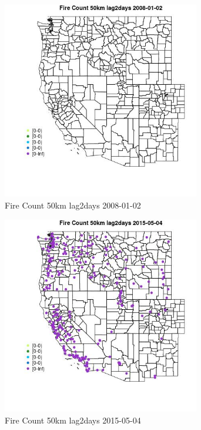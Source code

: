 \begin{figure} 
\centering  
\includegraphics[width=0.77\textwidth]{Code_Outputs/Report_ML_input_PM25_Step4_part_e_de_duplicated_aves_compiled_2019-05-18wNAs_MapObsFire_Count_50km_lag2days2008-01-02.jpg} 
\caption{\label{fig:Report_ML_input_PM25_Step4_part_e_de_duplicated_aves_compiled_2019-05-18wNAsMapObsFire_Count_50km_lag2days2008-01-02}Fire Count 50km lag2days 2008-01-02} 
\end{figure} 
 

\begin{figure} 
\centering  
\includegraphics[width=0.77\textwidth]{Code_Outputs/Report_ML_input_PM25_Step4_part_e_de_duplicated_aves_compiled_2019-05-18wNAs_MapObsFire_Count_50km_lag2days2015-05-04.jpg} 
\caption{\label{fig:Report_ML_input_PM25_Step4_part_e_de_duplicated_aves_compiled_2019-05-18wNAsMapObsFire_Count_50km_lag2days2015-05-04}Fire Count 50km lag2days 2015-05-04} 
\end{figure} 
 

